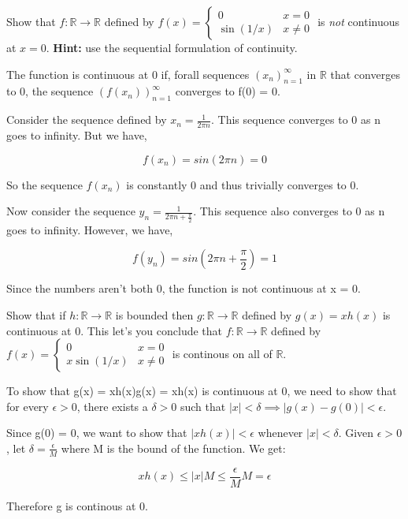 \documentclass[answers]{exam}
\theoremstyle{remark}
\theoremstyle{definition}
\newcommand{\RR}{\mathbb{R}}
\begin{document}
\begin{questions}
\question[4] Show that $f: \RR \to \RR$ defined by $f(x)= \begin{cases}
0 &x=0 \\
\sin(1/x) & x \not=0
\end{cases}$ is \emph{not} continuous at $x=0$. \textbf{Hint:} use the sequential formulation of continuity.
\begin{solution}

The function is continuous at 0 if, forall sequences $(x_n)_{n=1}^{\infty}$ in $\RR$
that converges to 0, the sequence $(f(x_n))_{n=1}^{\infty}$ converges to f(0) = 0.

Consider the sequence defined by $x_n = \frac{1}{2 \pi n}$.
This sequence converges to 0 as n goes to infinity.
But we have,

\[f(x_n) = sin(2 \pi n) = 0\]

So the sequence $f(x_n)$ is constantly 0 and thus trivially converges to 0.

Now consider the sequence $y_n = \frac{1}{2 \pi n + \frac{\pi}{2}}$.
This sequence also converges to 0 as n goes to infinity.
However, we have,

\[f(y_n) = sin(2 \pi n + \frac{\pi}{2}) = 1\]

Since the numbers aren't both 0, the function is not continuous at x = 0.

\end{solution}


\question[4] Show that if $h: \RR \to \RR$ is bounded then $g: \RR \to \RR$ defined by $g(x)=xh(x)$ is continuous at $0$. This let's you conclude that $f: \RR \to \RR$ defined by $f(x)= \begin{cases}
0 &x=0 \\
x\sin(1/x) & x \not=0
\end{cases}$ is continous on all of $\RR$.
\begin{solution}

To show that g(x) = xh(x)g(x) = xh(x) is continuous at 0,
we need to show that for every $\epsilon > 0$,
there exists a $\delta > 0$ such that $|x| < \delta \implies |g(x) - g(0)| < \epsilon$.

Since g(0) = 0, we want to show that $|xh(x)| < \epsilon$ whenever $|x| < \delta$.
Given $\epsilon > 0$, let $\delta = \frac{\epsilon}{M}$ where M is the bound of the function.
We get:

\[xh(x) \leq |x|M \leq \frac{\epsilon}{M} M = \epsilon\]

Therefore g is continous at 0.


\end{solution}
\end{questions}
\end{document}
